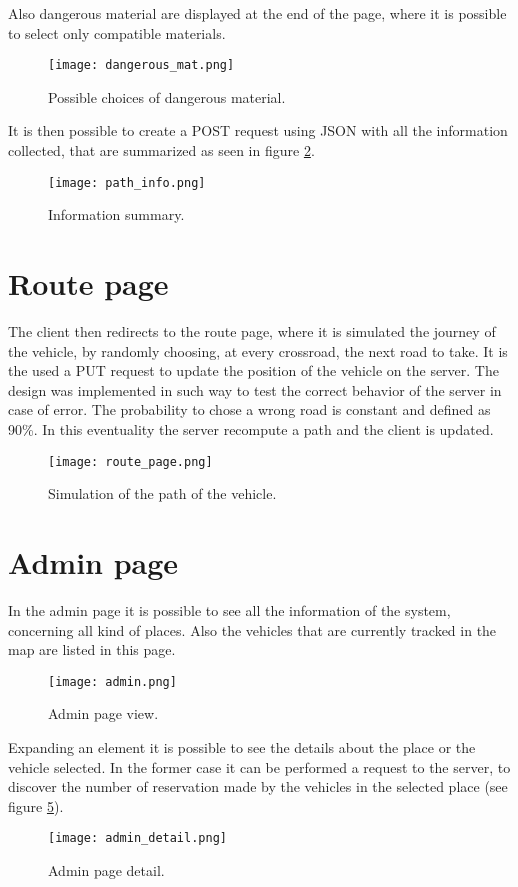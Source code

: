 \newpage
Also dangerous material are displayed at the end of the page, where it is possible to select only compatible materials.

\begin{figure}[!htb]
	\centering
	\texttt{[image: dangerous\_mat.png]}
	\caption{Possible choices of dangerous material.}\label{Fig:dangerous_mat}
\end{figure}

It is then possible to create a POST request using JSON with all the information collected, that are summarized as seen in figure \ref{Fig:path_info}.

\begin{figure}[!htb]
	\centering
	\texttt{[image: path\_info.png]}
	\caption{Information summary.}\label{Fig:path_info}
\end{figure}

\newpage
\section{Route page}
The client then redirects to the route page, where it is simulated the journey of the vehicle, by randomly choosing, at every crossroad, the next road to take.
It is the used a PUT request to update the position of the vehicle on the server.
The design was implemented in such way to test the correct behavior of the server in case of error.
The probability to chose a wrong road is constant and defined as 90\%. In this eventuality the server recompute a path and the client is updated.

\begin{figure}[!htb]
	\centering
	\texttt{[image: route\_page.png]}
	\caption{Simulation of the path of the vehicle.}\label{Fig:route}
\end{figure}

\newpage
\section{Admin page}
In the admin page it is possible to see all the information of the system, concerning all kind of places. Also the vehicles that are currently tracked in the map are listed in this page. 

\begin{figure}[!htb]
	\centering
	\texttt{[image: admin.png]}
	\caption{Admin page view.}\label{Fig:admin}
\end{figure}

Expanding an element it is possible to see the details about the place or the vehicle selected. In the former case it can be performed a request to the server, to discover the number of reservation made by the vehicles in the selected place (see figure \ref{Fig:admin_detail}).

\begin{figure}[!htb]
	\centering
	\texttt{[image: admin\_detail.png]}
	\caption{Admin page detail.}\label{Fig:admin_detail}
\end{figure}